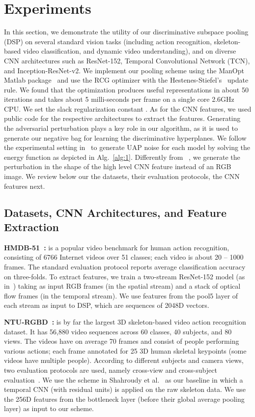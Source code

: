 \documentclass[runningheads]{llncs}
\begin{document}
 \section{Experiments}
\label{experiment}
In this section, we demonstrate the utility of our discriminative subspace pooling (DSP) on several standard vision tasks (including action recognition, skeleton-based video classification, and dynamic video understanding), and on diverse CNN architectures such as ResNet-152, Temporal Convolutional Network (TCN), and Inception-ResNet-v2.  We implement our pooling scheme using the ManOpt Matlab package~\cite{boumal2014manopt} and use the RCG optimizer with the Hestenes-Stiefel's~\cite{hager2005new} update rule. We found that the optimization produces useful representations in about 50 iterations and takes about 5 milli-seconds per frame on a single core 2.6GHz CPU.  We set the slack regularization constant . As for the CNN features, we used public code for the respective architectures to extract the features. Generating the adversarial perturbation plays a key role in our algorithm, as it is used to generate our negative bag for learning the discriminative hyperplanes. We follow the experimental setting in~\cite{moosavi2017universal} to generate UAP noise for each model by solving the energy function as depicted in Alg.~\ref{alg:1}. Differently from ~\cite{moosavi2017universal}, we generate the perturbation in the shape of the high level CNN feature instead of an RGB image. We review below our the datasets, their evaluation protocols, the CNN features next.

\subsection{Datasets, CNN Architectures, and Feature Extraction}
\noindent\textbf{HMDB-51~\cite{kuehne2011hmdb}:} is a popular video benchmark for human action recognition, consisting of 6766 Internet videos over 51 classes; each video is about 20 -- 1000 frames. The standard evaluation protocol reports average classification accuracy on three-folds. To extract features, we train a two-stream ResNet-152 model (as in~\cite{simonyan2014two}) taking as input RGB frames (in the spatial stream) and a stack of optical flow frames (in the temporal stream). We use features from the pool5 layer of each stream as input to DSP, which are sequences of 2048D vectors.

\noindent\textbf{NTU-RGBD~\cite{shahroudy2016ntu}:} is by far the largest 3D skeleton-based video action recognition dataset. It has 56,880 video sequences across 60 classes, 40 subjects, and 80 views. The videos have on average 70 frames and consist of people performing various actions; each frame annotated for 25 3D human skeletal keypoints (some videos have multiple people). According to different subjects and  camera views, two evaluation protocols are used, namely cross-view and cross-subject evaluation~\cite{shahroudy2016ntu}. We use the scheme in Shahroudy et al.~\cite{shahroudy2016ntu} as our baseline in which a temporal CNN (with residual units) is applied on the raw skeleton data. We use the 256D features from the bottleneck layer (before their global average pooling layer) as input to our scheme. 
\end{document}
